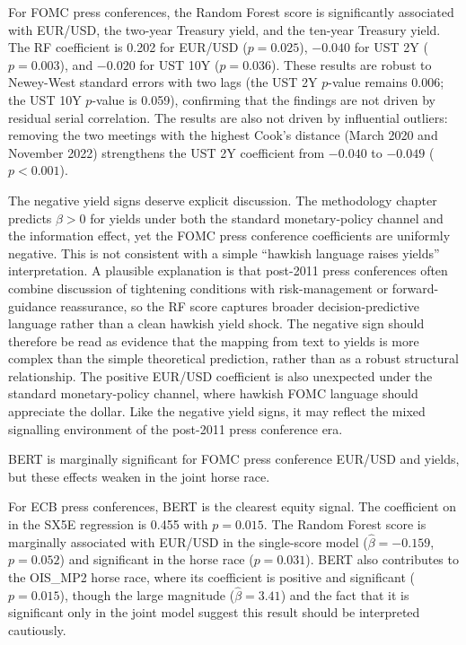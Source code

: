 For FOMC press conferences, the Random Forest score is significantly
associated with EUR/USD, the two-year Treasury yield, and the ten-year
Treasury yield. The RF coefficient is 0.202 for EUR/USD ($p=0.025$),
$-0.040$ for UST 2Y ($p=0.003$), and $-0.020$ for UST 10Y ($p=0.036$).
These results are robust to Newey-West standard errors with two lags
(the UST 2Y $p$-value remains 0.006; the UST 10Y $p$-value is 0.059),
confirming that the findings are not driven by residual serial correlation.
The results are also not driven by influential outliers: removing the two
meetings with the highest Cook's distance (March 2020 and November 2022)
strengthens the UST 2Y coefficient from $-0.040$ to $-0.049$ ($p<0.001$).

The negative yield signs deserve explicit discussion. The methodology chapter
predicts $\beta>0$ for yields under both the standard monetary-policy channel
and the information effect, yet the FOMC press conference coefficients are
uniformly negative. This is not consistent with a simple ``hawkish language
raises yields'' interpretation. A plausible explanation is that post-2011 press
conferences often combine discussion of tightening conditions with
risk-management or forward-guidance reassurance, so the RF score captures
broader decision-predictive language rather than a clean hawkish yield shock.
The negative sign should therefore be read as evidence that the mapping from
text to yields is more complex than the simple theoretical prediction, rather
than as a robust structural relationship. The positive EUR/USD coefficient is
also unexpected under the standard monetary-policy channel, where hawkish FOMC
language should appreciate the dollar. Like the negative yield signs, it may
reflect the mixed signalling environment of the post-2011 press conference era.

BERT is marginally significant for FOMC press conference EUR/USD and
yields, but these effects weaken in the joint horse race.

For ECB press conferences, BERT is the clearest equity signal. The
coefficient on \bertscore{} in the SX5E regression is 0.455 with $p=0.015$.
The Random Forest score is marginally associated with EUR/USD in the
single-score model ($\hat{\beta}=-0.159$, $p=0.052$) and significant in the
horse race ($p=0.031$). BERT also contributes to the OIS\_MP2 horse
race, where its coefficient is positive and significant ($p=0.015$), though
the large magnitude ($\hat{\beta}=3.41$) and the fact that it is significant
only in the joint model suggest this result should be interpreted cautiously.


